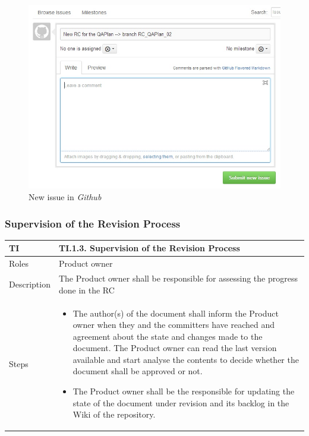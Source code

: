 \documentclass{template/openetcs_article}
\begin{document}
\begin{figure}[H]
\centering
\includegraphics [width=\textwidth]{./figures/NewIssue.JPG}
\caption{New issue in {\it Github}}
\end{figure}

\subsubsection{Supervision of the Revision Process}

\begin{flushleft}
\tablefirsthead{}
\tablehead{}
\tabletail{}
\tablelasttail{}
\begin{supertabular}{|m{2cm}|m{13cm}|}
\hline
{}
TI & 
TI.1.3. Supervision of the Revision Process
\\\hline
Roles &
Product owner
\\\hline
Description &
The Product owner shall be responsible for assessing the progress done in the RC
\\\hline
Steps &
\begin{itemize}
\item The author(s) of the document shall inform the Product owner when they and the committers have reached and agreement about the state and changes made to the document. The Product owner can read the last version available and start analyse the contents to decide whether the document shall be approved or not.
\item The Product owner shall be the responsible for updating the state of the document under revision and its backlog in the Wiki of the repository. 
\end{itemize}
\\\hline
\end{supertabular}
\end{flushleft}
\end{document}
